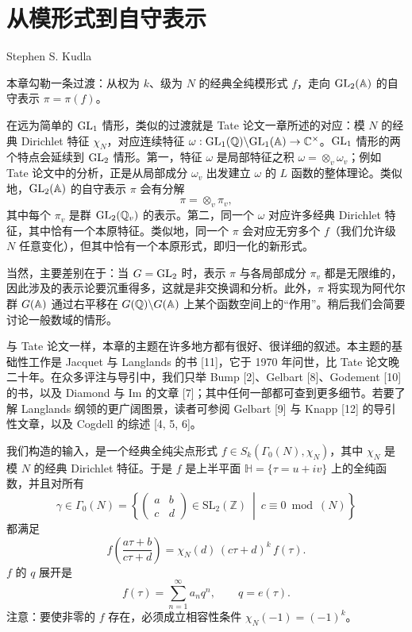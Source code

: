 \chapter{从模形式到自守表示}\label{ch:07}

\begin{center}
Stephen S. Kudla
\end{center}

本章勾勒一条过渡：从权为 $k$、级为 $N$ 的经典全纯模形式 $f$，走向 $\mathrm{GL}_2(\mathbb{A})$ 的自守表示 $\pi=\pi(f)$。

在远为简单的 $\mathrm{GL}_1$ 情形，类似的过渡就是 Tate 论文一章所述的对应：模 $N$ 的经典 Dirichlet 特征 $\chi_N$，对应连续特征 $\omega:\mathrm{GL}_1(\mathbb{Q})\backslash\mathrm{GL}_1(\mathbb{A})\to\mathbb{C}^\times$。$\mathrm{GL}_1$ 情形的两个特点会延续到 $\mathrm{GL}_2$ 情形。第一，特征 $\omega$ 是局部特征之积 $\omega=\otimes_v\omega_v$；例如 Tate 论文中的分析，正是从局部成分 $\omega_v$ 出发建立 $\omega$ 的 $L$ 函数的整体理论。类似地，$\mathrm{GL}_2(\mathbb{A})$ 的自守表示 $\pi$ 会有分解
\[
\pi=\otimes_v\pi_v,
\]
其中每个 $\pi_v$ 是群 $\mathrm{GL}_2(\mathbb{Q}_v)$ 的表示。第二，同一个 $\omega$ 对应许多经典 Dirichlet 特征，其中恰有一个本原特征。类似地，同一个 $\pi$ 会对应无穷多个 $f$（我们允许级 $N$ 任意变化），但其中恰有一个本原形式，即归一化的新形式。

当然，主要差别在于：当 $G=\mathrm{GL}_2$ 时，表示 $\pi$ 与各局部成分 $\pi_v$ 都是无限维的，因此涉及的表示论要沉重得多，这就是非交换调和分析。此外，$\pi$ 将实现为阿代尔群 $G(\mathbb{A})$ 通过右平移在 $G(\mathbb{Q})\backslash G(\mathbb{A})$ 上某个函数空间上的“作用”。稍后我们会简要讨论一般数域的情形。

与 Tate 论文一样，本章的主题在许多地方都有很好、很详细的叙述。本主题的基础性工作是 Jacquet 与 Langlands 的书 [11]，它于 1970 年问世，比 Tate 论文晚二十年。在众多评注与导引中，我们只举 Bump [2]、Gelbart [8]、Godement [10] 的书，以及 Diamond 与 Im 的文章 [7]；其中任何一部都可查到更多细节。若要了解 Langlands 纲领的更广阔图景，读者可参阅 Gelbart [9] 与 Knapp [12] 的导引性文章，以及 Cogdell 的综述 [4, 5, 6]。

我们构造的输入，是一个经典全纯尖点形式 $f\in S_k(\Gamma_0(N),\chi_N)$，其中 $\chi_N$ 是模 $N$ 的经典 Dirichlet 特征。于是 $f$ 是上半平面 $\mathbb{H}=\{\tau=u+iv\}$ 上的全纯函数，并且对所有
\[
\gamma\in\Gamma_0(N)=\left\{\begin{pmatrix}a&b\\c&d\end{pmatrix}\in\mathrm{SL}_2(\mathbb{Z})\ \middle|\ c\equiv 0\bmod(N)\right\}
\]
都满足
\begin{equation*}\tag{1.1}
f\!\left(\frac{a\tau+b}{c\tau+d}\right)=\chi_N(d)\,(c\tau+d)^k\,f(\tau).
\end{equation*}
$f$ 的 $q$ 展开是
\begin{equation*}\tag{1.2}
f(\tau)=\sum_{n=1}^{\infty}a_nq^n,\qquad q=e(\tau).
\end{equation*}
注意：要使非零的 $f$ 存在，必须成立相容性条件 $\chi_N(-1)=(-1)^k$。

